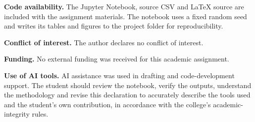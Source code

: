 \documentclass[9pt,a4paper,twocolumn]{extarticle}
\begin{document}
\noindent\textbf{Code availability.} The Jupyter Notebook, source CSV and LaTeX source are included with the assignment materials. The notebook uses a fixed random seed and writes its tables and figures to the project folder for reproducibility.

\noindent\textbf{Conflict of interest.} The author declares no conflict of interest.

\noindent\textbf{Funding.} No external funding was received for this academic assignment.

\noindent\textbf{Use of AI tools.} AI assistance was used in drafting and code-development support. The student should review the notebook, verify the outputs, understand the methodology and revise this declaration to accurately describe the tools used and the student's own contribution, in accordance with the college's academic-integrity rules.
\end{document}
